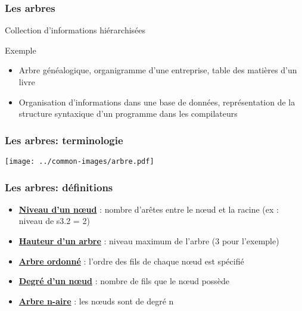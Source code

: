 \documentclass[table,handout,tikz,12pt,svgnames]{beamer}
\subtitle{\LARGE Les Arbres}
\date{CM7}
\begin{document}
\begin{frame}
	\titlepage
\end{frame}

\begin{frame}[fragile=singleslide]
	\frametitle{Les arbres}
		\begin{block}{Collection d'informations hiérarchisées}
		\end{block}
		\begin{block}{Exemple}
			\begin{itemize}
				\item Arbre généalogique, organigramme d'une entreprise, table des matières d'un livre
				\item Organisation d'informations dans une base de données, représentation de la structure syntaxique d'un programme dans les compilateurs
			\end{itemize}
		\end{block}
\end{frame}


\begin{frame}[fragile=singleslide]
	\frametitle{Les arbres: terminologie}
	\vspace{-4em}
	\begin{block}{}
    \begin{adjustwidth}{-0.9cm}{}
		
		\begin{center}
		{\texttt{[image: ../common-images/arbre.pdf]}}
		\end{center}
	\end{adjustwidth}
	\end{block}
\end{frame}


\begin{frame}[fragile=singleslide]
	\frametitle{Les arbres: définitions}
	\begin{block}{}
		\begin{itemize}
			\item \underline{\textbf{Niveau d'un nœud}} : nombre d'arêtes entre le nœud et la racine (ex : niveau de s3.2 = 2)
			\item \underline{\textbf{Hauteur d'un arbre}} : niveau maximum de l'arbre (3 pour l'exemple)
			\item \underline{\textbf{Arbre ordonné}} : l'ordre des fils de chaque nœud est spécifié
			\item \underline{\textbf{Degré d'un nœud}} : nombre de fils que le nœud possède
			\item \underline{\textbf{Arbre n-aire}} : les nœuds sont de degré n
		\end{itemize}
	\end{block}
\end{frame}
\end{document}
